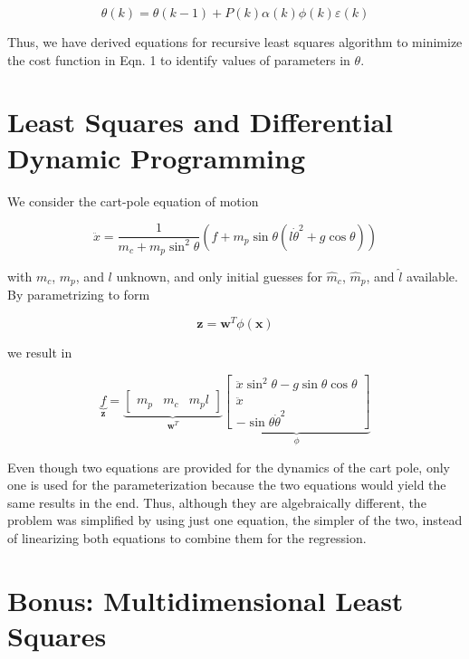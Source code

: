 \documentclass{article}
\begin{document}
\begin{equation}
\theta(k) = \theta(k-1) + P(k) \alpha(k) \phi(k) \varepsilon(k)
\end{equation}

Thus, we have derived equations for recursive least squares algorithm to minimize the cost function in Eqn. 1 to identify values of parameters in $\theta$.

\section{Least Squares and Differential Dynamic Programming}

We consider the cart-pole equation of motion

\begin{equation}
\ddot{x} = \frac{1}{m_c + m_p \sin^2 \theta} (f + m_p \sin \theta (l \dot{\theta}^2 + g \cos \theta))
\end{equation}

with $m_c$, $m_p$, and $l$ unknown, and only initial guesses for $\hat{m}_c$, $\hat{m}_p$, and $\hat{l}$ available. By parametrizing to form

\begin{equation}
\mathbf{z} = \mathbf{w}^T \phi(\mathbf{x})
\end{equation}

we result in

\begin{equation}
\underbrace{f}_{\mathbf{z}} = 
\underbrace{
\begin{bmatrix}
m_p & m_c &m_p  l
\end{bmatrix}}_{\mathbf{w}^T}
\underbrace{
\begin{bmatrix}
\ddot{x} \sin^2 \theta - g \sin \theta \cos \theta \\
\ddot{x} \\
- \sin \theta \dot{\theta}^2
\end{bmatrix}}_{\phi}
\end{equation}

Even though two equations are provided for the dynamics of the cart pole, only one is used for the parameterization because the two equations would yield the same results in the end. Thus, although they are algebraically different, the problem was simplified by using just one equation, the simpler of the two, instead of linearizing both equations to combine them for the regression.

\section{Bonus: Multidimensional Least Squares}
\end{document}
